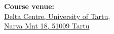 \documentclass[a4paper,twoside,12pt]{book}
\begin{document}
\noindent
\large
\textbf{Course venue:}\\[1ex]
\normalsize
\href{https://delta.ut.ee/en/}{Delta Centre, University of Tartu},\\
\href{https://goo.gl/maps/pVZbwpX84kbgQuXM9}{Narva Mnt 18, 51009 Tartu}\\[1em]
\normalsize

\vfill
\end{document}
